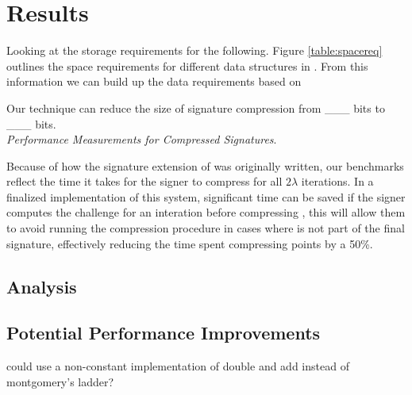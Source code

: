 \section{Results}

Looking at the storage requirements for the following. Figure \ref{table:spacereq} outlines the space requirements for different data structures in \sidh. From this information we can build up the data requirements based on  

Our technique can reduce the size of \sidh signature compression from \_\_\_ bits to \_\_\_ bits.\\

\noindent
\textit{Performance Measurements for Compressed Signatures}.

Because of how the signature extension of \sidh was originally written, our benchmarks reflect the time it takes for the signer to compress  for all $2\lambda$ iterations. In a finalized implementation of this system, significant time can be saved if the signer computes the challenge for an interation before compressing , this will allow them to avoid running the compression procedure in cases where  is not part of the final signature, effectively reducing the time spent compressing points by a 50\%.

\subsection{Analysis}



\subsection{Potential Performance Improvements}

could use a non-constant implementation of double and add instead of montgomery's ladder? 

